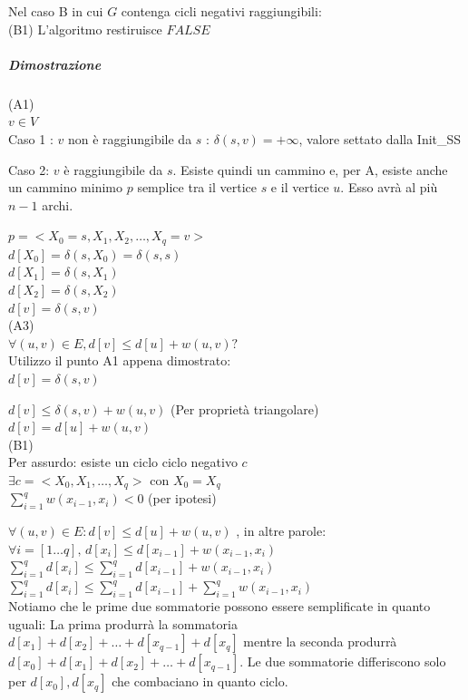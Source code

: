 \documentclass[11pt,a4paper,twoside,openright]{book}
\let\oldsubparagraph\subparagraph
\renewcommand{\subparagraph}[1]{\oldsubparagraph{#1}\mbox{}}
\begin{document}
{{Nel caso B in cui $G$ contenga cicli negativi raggiungibili: \\
(B1) L'algoritmo restiruisce $FALSE$

\subparagraph{Dimostrazione}

(A1) \\ 
$v \in V$ \\ 
Caso 1 : $v$ non è raggiungibile da $s$ : $ \delta(s,v) = + \infty $, valore settato dalla Init\_SS

Caso 2: $v$ è raggiungibile da $s$. Esiste quindi un cammino e, per A, esiste anche un cammino minimo $p$ semplice tra il vertice $s$ e il vertice $u$. Esso avrà al più $n-1$ archi.

$p = <X_0=s, X_1, X_2, \ldots, X_q=v>$ \\
$d[X_0] = \delta(s,X_0) = \delta(s,s)$ \\
$d[X_1] = \delta(s,X_1)$ \\
$d[X_2] = \delta(s,X_2)$ \\
$d[v] = \delta(s,v)$ \\

(A3) \\ 
$\forall (u,v) \in E, d[v] \leq d[u] + w(u,v) ? $\\
Utilizzo il punto A1 appena dimostrato:\\
$d[v] = \delta(s,v)$

$d[v] \leq \delta(s,v) + w(u,v)$ (Per proprietà triangolare)\\
$d[v] = d[u] + w(u,v)$ \\

(B1) \\ 
Per assurdo: esiste un ciclo ciclo negativo $c$ \\
$\exists c = <X_0,X_1,\ldots,X_q>$ con $X_0 =  X_q$ \\ 
$\sum_{i=1}^{q}{w(x_{i-1},x_i)} < 0$ (per ipotesi)

$\forall (u,v) \in E : d[v] \leq d[u] + w(u,v)$ , in altre parole: \\
$\forall i = [1\ldots q],\,d[x_i] \leq d[x_{i-1}] + w(x_{i-1},x_i)$ \\ 

$\sum_{i=1}^q{d[x_i]} \leq \sum_{i=1}^q{d[x_{i-1}] + w(x_{i-1},x_i)}$ \\

$\sum_{i=1}^q{d[x_i]} \leq \sum_{i=1}^q{d[x_{i-1}]} + \sum_{i=1}^q{w(x_{i-1},x_i)}$ \\

Notiamo che le prime due sommatorie possono essere semplificate in quanto uguali: La prima produrrà la sommatoria $d[x_1] + d[x_2] +\ldots + d[x_{q-1}] + d[x_q]$ mentre la seconda produrrà  $d[x_0] + d[x_1] + d[x_2] +\ldots + d[x_{q-1}]$. Le due sommatorie differiscono solo per $d[x_0],d[x_q]$ che combaciano in quanto ciclo.

}}
\end{document}
